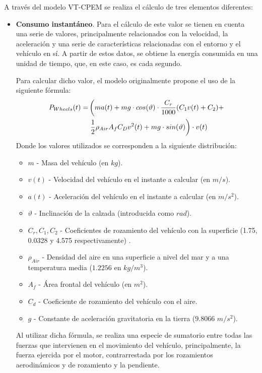 \documentclass[11pt,spanish,listoffigures,listoftables]{tfgetsinf}
\begin{document}
A través del modelo VT-CPEM se realiza el cálculo de tres elementos diferentes:
\begin{itemize}
    \item \textbf{Consumo instantáneo}. Para el cálculo de este valor se tienen en cuenta una serie de valores, principalmente relacionados con la velocidad, la aceleración y una serie de características relacionadas con el entorno y el vehículo en sí. A partir de estos datos, se obtiene la energía consumida en una unidad de tiempo, que, en este caso, es cada segundo.
    
    Para calcular dicho valor, el modelo originalmente propone el uso de la siguiente fórmula:
    \begin{align}
        P_{Wheels}(t) = & \left(ma(t) + mg\cdot cos(\vartheta) \cdot \frac{C_{r}}{1000}(C_{1}v(t) + C_{2}) + \right. \notag \\ 
        & \left. \frac{1}{2}\rho_{Air}A_{f}C_{D}v^{2}(t) + mg \cdot sin(\vartheta) \right) \cdot v(t)
    \end{align}
    Donde los valores utilizados se corresponden a la siguiente distribución:
    \begin{itemize}
        \item $m$ - Masa del vehículo (en $kg$).
        \item $v(t)$ - Velocidad del vehículo en el instante a calcular (en $m/s$).
        \item $a(t)$ - Aceleración del vehículo en el instante a calcular (en $m/s^2$).
        \item $\vartheta$ - Inclinación de la calzada (introducida como $rad$).
        \item $C_{r}, C_{1}, C_{2}$ - Coeficientes de rozamiento del vehículo con la superficie (1.75, 0.0328 y 4.575 respectivamente) \cite{RAKHA2001}.
        \item $\rho_{Air}$ - Densidad del aire en una superficie a nivel del mar y a una temperatura media ($1.2256$ en $kg/m^3$).
        \item $A_{f}$ - Área frontal del vehículo (en $m^2$).
        \item $C_{d}$ - Coeficiente de rozamiento del vehículo con el aire.
        \item $g$ - Constante de aceleración gravitatoria en la tierra ($9.8066$ $m/s^2$).
    \end{itemize}
    
    Al utilizar dicha fórmula, se realiza una especie de sumatorio entre todas las fuerzas que intervienen en el movimiento del vehículo, principalmente, la fuerza ejercida por el motor, contrarrestada por los rozamientos aerodinámicos y de rozamiento y la pendiente.
    

\end{itemize}
\end{document}
